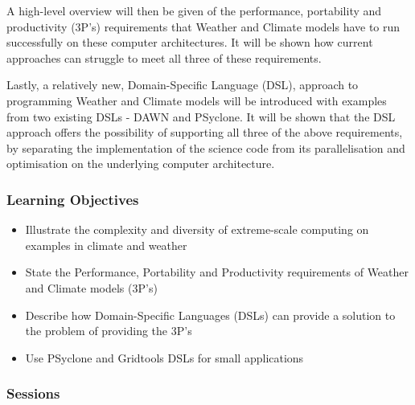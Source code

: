 A high-level overview will then be given of the performance, portability and productivity (3P's) requirements that Weather and Climate models have to run successfully on these computer architectures. It will be shown how current approaches can struggle to meet all three of these requirements.

Lastly, a relatively new, Domain-Specific Language (DSL), approach to programming Weather and Climate models will be introduced with examples from two existing DSLs - DAWN and PSyclone. It will be shown that the DSL approach offers the possibility of supporting all three of the above requirements, by separating the implementation of the science code from its parallelisation and optimisation on the underlying computer architecture.

\subsubsection{Learning Objectives}

\begin{itemize}

\item Illustrate the complexity and diversity of extreme-scale computing on examples in climate and weather
\item State the Performance, Portability and Productivity requirements of Weather and Climate models (3P's)
\item Describe how Domain-Specific Languages (DSLs) can provide a solution to the problem of providing the 3P's
\item Use PSyclone and Gridtools DSLs for small applications

\end{itemize}

\subsubsection{Sessions}

